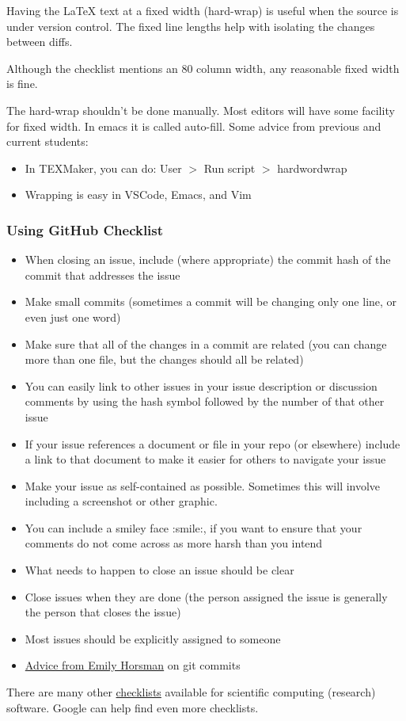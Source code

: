 \documentclass[12pt]{article}
\begin{document}
Having the \LaTeX{} text at a fixed width (hard-wrap) is useful when the source
is under version control. The fixed line lengths help with isolating the
changes between diffs.

Although the checklist mentions an 80 column width, any reasonable fixed width
is fine.

The hard-wrap shouldn't be done manually. Most editors will have some facility
for fixed width. In emacs it is called auto-fill. Some advice from previous and
current students:

\begin{itemize}
  \item In TEXMaker, you can do: User $>$ Run script $>$ hardwordwrap
  \item Wrapping is easy in VSCode, Emacs, and Vim
\end{itemize}

\subsubsection*{Using GitHub Checklist}

\begin{itemize}
  \item When closing an issue, include (where appropriate) the commit hash of the
        commit that addresses the issue
  \item Make small commits (sometimes a commit will be changing only one line, or even
        just one word)
  \item Make sure that all of the changes in a commit are related (you can change more
        than one file, but the changes should all be related)
  \item You can easily link to other issues in your issue description or discussion
        comments by using the hash symbol followed by the number of that other issue
  \item If your issue references a document or file in your repo (or elsewhere) include
        a link to that document to make it easier for others to navigate your issue
  \item Make your issue as self-contained as possible. Sometimes this will involve
        including a screenshot or other graphic.
  \item You can include a smiley face :smile:, if you want to ensure that your comments
        do not come across as more harsh than you intend
  \item What needs to happen to close an issue should be clear
  \item Close issues when they are done (the person assigned the issue is generally the
        person that closes the issue)
  \item Most issues should be explicitly assigned to someone \item
        \href{https://gitlab.cas.mcmaster.ca/smiths/se2aa4_cs2me3/-/blob/master/FAQ/GitAdvice.txt}
        {Advice from Emily Horsman} on git commits
\end{itemize}

There are many other
\href{https://gitlab.cas.mcmaster.ca/SEforSC/se4sc/-/wikis/Advice-and-Checklists-for-Repos-(including-a-list-of-recommended-artifacts)}{checklists}
available for scientific computing (research) software. Google can help find
even more checklists.
\end{document}
